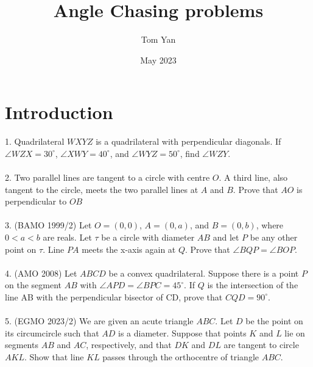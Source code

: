 \documentclass{article}
\title{Angle Chasing problems}
\author{Tom Yan}
\date{May 2023}
\begin{document}
\maketitle

\section{Introduction}
1. Quadrilateral $WXYZ$ is a quadrilateral with perpendicular diagonals. If $\angle WZX = 30^{\circ}$, $\angle XWY = 40^{\circ}$, and $\angle WYZ = 50^{\circ}$, find $\angle WZY$.\\\\
2. Two parallel lines are tangent to a circle with centre $O$. A third line, also tangent to
the circle, meets the two parallel lines at $A$ and $B$. Prove that $AO$ is perpendicular to $OB$\\\\
3. (BAMO 1999/2) Let $O = (0, 0)$, $A = (0, a)$, and $B = (0, b)$, where $0 < a<b$ are reals. Let $\tau$ be a circle with diameter $AB$ and let $P$ be any other point on $\tau$. Line
$PA$ meets the x-axis again at $Q$. Prove that $\angle BQP = \angle BOP$. \\\\
4. (AMO 2008)  Let $ABCD$ be a convex quadrilateral. Suppose there is a point $P$ on the
segment $AB$ with $\angle APD = \angle BPC = 45^{\circ}$. If $Q$ is the intersection of the line AB with the perpendicular bisector of CD, prove that $CQD = 90^{\circ}$.\\\\
5. (EGMO 2023/2) We are given an acute triangle $ABC$. Let $D$ be the point on its circumcircle such that $AD$ is a diameter. Suppose that points $K$ and $L$ lie on segments $AB$ and $AC$, respectively, and that $DK$ and $DL$ are tangent to circle $AKL$.
Show that line $KL$ passes through the orthocentre of triangle $ABC$.
\end{document}
